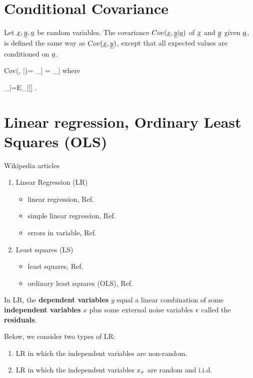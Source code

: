 \section{Conditional Covariance}
Let ${\underline{x}}, {\underline{y}}, {\underline{a}}$
be random variables.
The covariance $Cov({\underline{x}}, {\underline{y}}|{\underline{a}})$
of ${\underline{x}}$ and ${\underline{y}}$ 
given ${\underline{a}}$, is defined
the same
way as $Cov({\underline{x}}, {\underline{y}})$,
except that all
expected values are 
conditioned on ${\underline{a}}$. 



\beq
Cov(\rvx, \rvy|\rva)=
\av{\rvx, \rvy}_{|\rva}
=
\av{(\rvx-\av{\rvx}_{|\rva})
(\rvy-\av{\rvy}_{|\rva})}_{|\rva}
\eeq
where

\beq
\av{\rvx}_{|\rva}=E_{\rvx|\rva}[\rvx]
\;.
\eeq

\section{Linear regression, Ordinary Least Squares (OLS)}
Wikipedia articles
\begin{enumerate}
\item
Linear Regression (LR)
\begin{itemize}
\item
linear regression, Ref.\cite{wiki-lr}
\item
 simple linear regression, Ref.\cite{wiki-slr}
\item
errors in variable, Ref.\cite{wiki-errors-in-iv}

\end{itemize}
\item
Least squares (LS)
\begin{itemize}
\item
least squares, Ref.\cite{wiki-ls}
\item
ordinary least squares (OLS), Ref.\cite{wiki-ols}
\end{itemize}
\end{enumerate}


In LR, the {\bf dependent variables} 
$y$
equal
a linear combination of some
{\bf independent variables} $x$ 
 plus some external noise variables
$\epsilon$ called the {\bf residuals}.

Below, we consider two types of LR:

\begin{enumerate}
\item
LR
in which the independent
 variables are non-random.
\item
LR
in which the independent
 variables $x_\sigma$ are random
and i.i.d.
\end{enumerate}

